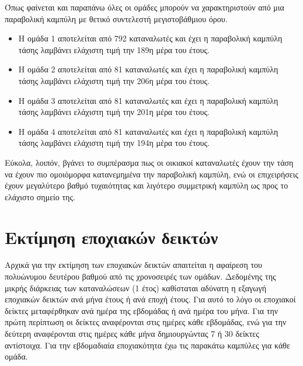 \documentclass[a4paper, 11pt]{article}
\begin{document}
Όπως φαίνεται και παραπάνω όλες οι ομάδες μπορούν να χαρακτηριστούν από μια παραβολική καμπύλη με θετικό συντελεστή μεγιστοβάθμιου όρου.
\begin{itemize}
\item Η ομάδα 1 αποτελείται από 792 καταναλωτές και έχει η παραβολική καμπύλη τάσης λαμβάνει ελάχιστη τιμή την 189η μέρα του έτους.
\item Η ομάδα 2 αποτελείται από 81 καταναλωτές και έχει η παραβολική καμπύλη τάσης λαμβάνει ελάχιστη τιμή την 206η μέρα του έτους. 
\item Η ομάδα 3 αποτελείται από 81 καταναλωτές και έχει η παραβολική καμπύλη τάσης λαμβάνει ελάχιστη τιμή την 201η μέρα του έτους.
\item Η ομάδα 4 αποτελείται από 81 καταναλωτές και έχει η παραβολική καμπύλη τάσης λαμβάνει ελάχιστη τιμή την 194η μέρα του έτους.
\end{itemize}


Εύκολα, λοιπόν, βγάνει το συμπέρασμα πως οι οικιακοί καταναλωτές έχουν την τάση να έχουν πιο ομοιόμορφα κατανεμημένα την παραβολική καμπύλη, ενώ οι επιχειρήσεις έχουν μεγαλύτερο βαθμό τυχαιότητας και λιγότερο συμμετρική καμπύλη ως προς το ελάχιστο σημείο της.

\section{Εκτίμηση εποχιακών δεικτών}
Αρχικά για την εκτίμηση των εποχιακών δεικτών απαιτείται η αφαίρεση του πολυώνυμου δευτέρου βαθμού από τις χρονοσειρές των ομάδων.\cite{SCAN} Δεδομένης της μικρής διάρκειας των καταναλώσεων (1 έτος) καθίσταται αδύνατη η εξαγωγή εποχιακών δεικτών ανά μήνα έτους ή ανά εποχή έτους. Για αυτό το λόγο οι εποχιακοί δείκτες μεταφέρθηκαν ανά ημέρα της εβδομάδας ή ανά ημέρα του μήνα. Για την πρώτη περίπτωση οι δείκτες αναφέρονται στις ημέρες κάθε εβδομάδας, ενώ για την δεύτερη αναφέρονται στις ημέρες κάθε μήνα δημιουργώντας 7 ή 30 δείκτες αντίστοιχα. Για την εβδομαδιαία εποχιακότητα έχω τις παρακάτω καμπύλες για κάθε ομάδα.
\end{document}
